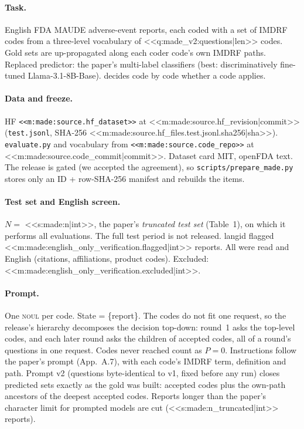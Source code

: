 \paragraph{Task.} English FDA MAUDE adverse-event reports, each coded with a set of IMDRF codes from a three-level
vocabulary of <<q:made_v2:questions|len>> codes. Gold sets are up-propagated along each coder code's own IMDRF paths.
Replaced predictor: the paper's multi-label classifiers (best: discriminatively fine-tuned Llama-3.1-8B-Base).
\jev{} decides code by code whether a code applies.

\paragraph{Data and freeze.} HF \texttt{<<m:made:source.hf_dataset>>} at <<m:made:source.hf_revision|commit>>
(\texttt{test.jsonl}, SHA-256 <<m:made:source.hf_files.test.jsonl.sha256|sha>>). \texttt{evaluate.py} and vocabulary
from \texttt{<<m:made:source.code_repo>>} at <<m:made:source.code_commit|commit>>. Dataset card MIT, openFDA text. The
release is gated (we accepted the agreement), so \texttt{scripts/prepare\_made.py} stores only an ID +
row-SHA-256 manifest and rebuilds the items.

\paragraph{Test set and English screen.} $N=$ <<s:made:n|int>>, the paper's \emph{truncated test set} (Table~1), on
which it performs all evaluations. The full test period is not released. langid flagged
<<m:made:english_only_verification.flagged|int>> reports. All were read and English (citations, affiliations,
product codes). Excluded: <<m:made:english_only_verification.excluded|int>>.

\paragraph{Prompt.} One \textsc{noul} per code. State = \{report\}. The codes do not fit one request, so the
release's hierarchy decomposes the decision top-down: round~1 asks the top-level codes, and each later round asks the
children of accepted codes, all of a round's questions in one request. Codes never reached count as
$P=0$. Instructions follow the paper's prompt (App.~A.7), with each code's IMDRF term,
definition and path. Prompt v2 (questions byte-identical to v1, fixed before any run) closes
predicted sets exactly as the gold was built: accepted codes plus the own-path ancestors of the deepest accepted
codes. Reports longer than the paper's character limit for prompted models are cut
(<<s:made:n_truncated|int>> reports).


